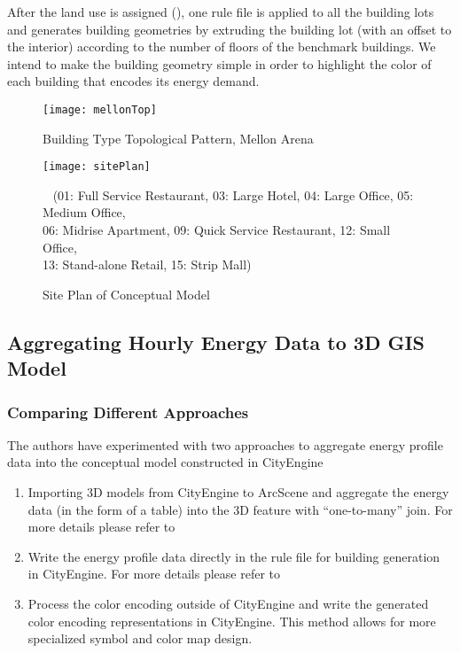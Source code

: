 After the land use is assigned (), one rule file is
applied to all the building lots and generates building geometries by
extruding the building lot (with an offset to the interior) according
to the number of floors of the benchmark buildings. We intend to make
the building geometry simple in order to highlight the color of each
building that encodes its energy demand.

\begin{figure}[h!]
  \centering
  \texttt{[image: mellonTop]}
  \caption[Building Type Topology]{Building Type Topological Pattern, Mellon Arena}
  \label{fig:mellonTop}
\end{figure}

\begin{figure}[h!]
  \centering
  \texttt{[image: sitePlan]}
  \caption[Conceptual Model Site Plan]{Site Plan of Conceptual Model}~ (01: Full Service
  Restaurant, 03: Large Hotel, 04: Large Office, 05: Medium Office,
  \\06: Midrise Apartment, 09: Quick Service Restaurant, 12: Small
  Office, \\13: Stand-alone Retail, 15: Strip Mall)
  \label{fig:sitePlan}
\end{figure}

\subsection{Aggregating Hourly Energy Data to 3D GIS Model}\label{sec:aggregateTime}
\subsubsection{Comparing Different Approaches}\label{dataClassification}
The authors have experimented with two approaches to aggregate energy
profile data into the conceptual model constructed in CityEngine
\begin{enumerate}[1)]
\item Importing 3D models from CityEngine to ArcScene and aggregate
  the energy data (in the form of a table) into the 3D feature with
  ``one-to-many'' join. For more details please refer to

\item Write the energy profile data directly in the rule file for
  building generation in CityEngine. For more details please refer to

\item Process the color encoding outside of CityEngine and write the
  generated color encoding representations in CityEngine. This method
  allows for more specialized symbol and color map design.

\end{enumerate}

